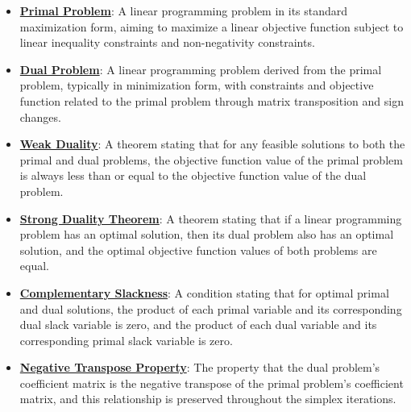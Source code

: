 \documentclass{article}%
\begin{document}
\begin{itemize}[leftmargin=*]%
\item \href{https://www.math.purdue.edu/~yipn/421/2024-09-12-Duality.pdf#page=1}{\textbf{Primal Problem}}: A linear programming problem in its standard maximization form, aiming to maximize a linear objective function subject to linear inequality constraints and non-negativity constraints.%
\item \href{https://www.math.purdue.edu/~yipn/421/2024-09-12-Duality.pdf#page=1}{\textbf{Dual Problem}}: A linear programming problem derived from the primal problem, typically in minimization form, with constraints and objective function related to the primal problem through matrix transposition and sign changes.%
\item \href{https://www.math.purdue.edu/~yipn/421/2024-09-12-Duality.pdf#page=2}{\textbf{Weak Duality}}: A theorem stating that for any feasible solutions to both the primal and dual problems, the objective function value of the primal problem is always less than or equal to the objective function value of the dual problem.%
\item \href{https://www.math.purdue.edu/~yipn/421/2024-09-12-Duality.pdf#page=11}{\textbf{Strong Duality Theorem}}: A theorem stating that if a linear programming problem has an optimal solution, then its dual problem also has an optimal solution, and the optimal objective function values of both problems are equal.%
\item \href{https://www.math.purdue.edu/~yipn/421/2024-09-12-Duality.pdf#page=5}{\textbf{Complementary Slackness}}: A condition stating that for optimal primal and dual solutions, the product of each primal variable and its corresponding dual slack variable is zero, and the product of each dual variable and its corresponding primal slack variable is zero.%
\item \href{https://www.math.purdue.edu/~yipn/421/2024-09-12-Duality.pdf#page=6}{\textbf{Negative Transpose Property}}: The property that the dual problem's coefficient matrix is the negative transpose of the primal problem's coefficient matrix, and this relationship is preserved throughout the simplex iterations.%
\end{itemize}

%
\end{document}
